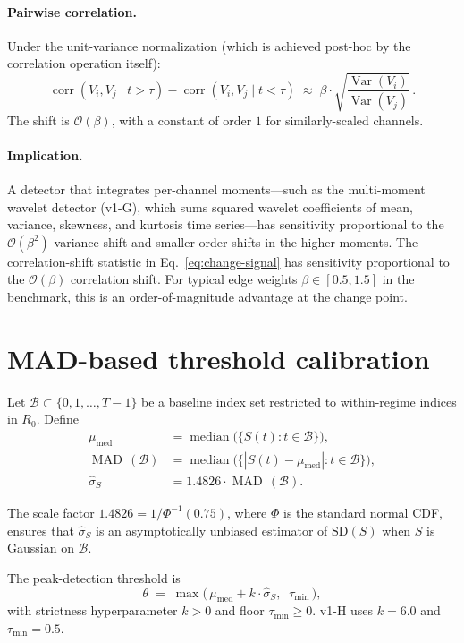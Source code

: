 \documentclass[11pt,a4paper]{article}
\newcommand{\Var}{\operatorname{Var}}
\newcommand{\corr}{\operatorname{corr}}
\newcommand{\MAD}{\operatorname{MAD}}
\newcommand{\med}{\operatorname{median}}
\begin{document}
\paragraph{Pairwise correlation.}
Under the unit-variance normalization (which is achieved post-hoc by the
correlation operation itself):
\begin{equation}
\corr(V_i, V_j \mid t > \tau) - \corr(V_i, V_j \mid t < \tau)
\;\approx\; \beta \cdot \sqrt{\frac{\Var(V_i)}{\Var(V_j)}}\,.
\end{equation}
The shift is $\mathcal{O}(\beta)$, with a constant of order $1$ for
similarly-scaled channels.

\paragraph{Implication.}
A detector that integrates per-channel moments---such as the multi-moment
wavelet detector (v1-G), which sums squared wavelet coefficients of mean,
variance, skewness, and kurtosis time series---has sensitivity proportional
to the $\mathcal{O}(\beta^2)$ variance shift and smaller-order shifts in
the higher moments. The correlation-shift statistic in
Eq.~\eqref{eq:change-signal} has sensitivity proportional to the
$\mathcal{O}(\beta)$ correlation shift. For typical edge weights
$\beta \in [0.5, 1.5]$ in the benchmark, this is an order-of-magnitude
advantage at the change point.

\section{MAD-based threshold calibration}

Let $\mathcal{B} \subset \{0, 1, \ldots, T-1\}$ be a baseline index set
restricted to within-regime indices in $R_0$. Define
\begin{align}
\mu_{\text{med}} &= \med\!\big(\{S(t) : t \in \mathcal{B}\}\big), \\
\MAD\,(\mathcal{B}) &= \med\!\big(\{|S(t) - \mu_{\text{med}}| : t \in \mathcal{B}\}\big), \\
\hat\sigma_S &= 1.4826 \cdot \MAD\,(\mathcal{B}).
\end{align}

The scale factor $1.4826 = 1/\Phi^{-1}(0.75)$, where $\Phi$ is the standard
normal CDF, ensures that $\hat\sigma_S$ is an asymptotically unbiased
estimator of $\mathrm{SD}(S)$ when $S$ is Gaussian on $\mathcal{B}$.

The peak-detection threshold is
\begin{equation}
\boxed{\;
\theta \;=\; \max\!\big(\,\mu_{\text{med}} + k \cdot \hat\sigma_S,\;\; \tau_{\min}\,\big),
\;}
\end{equation}
with strictness hyperparameter $k > 0$ and floor $\tau_{\min} \ge 0$.
v1-H uses $k = 6.0$ and $\tau_{\min} = 0.5$.
\end{document}
